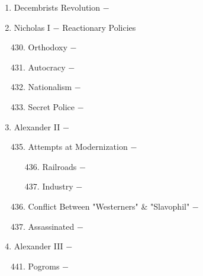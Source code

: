 \documentclass[12pt]{article}
\begin{document}
\begin{enumerate}
\item Decembrists Revolution $-$ 

\item Nicholas I $-$ Reactionary Policies

\begin{enumerate}[label=\arabic{*}.]
\setcounter{enumii}{429}

\item Orthodoxy $-$

\item Autocracy $-$ 

\item Nationalism $-$ 

\item Secret Police $-$ 

\end{enumerate}

\setcounter{enumi}{433}

\item Alexander II $-$ 

\begin{enumerate}[label=\arabic{*}.]
\setcounter{enumii}{434}

\item Attempts at Modernization $-$

\begin{enumerate}[label=\arabic{*}.]
\setcounter{enumiii}{435}

\item Railroads $-$ 

\item Industry $-$

\end{enumerate}
\setcounter{enumii}{437}

\item Conflict Between "Westerners" \& "Slavophil" $-$

\item Assassinated $-$

\end{enumerate}
\setcounter{enumi}{439}

\item Alexander III $-$ 


\begin{enumerate}[label=\arabic{*}.]
\setcounter{enumii}{440}

\item Pogroms $-$ 

\end{enumerate}
\setcounter{enumi}{441}


\end{enumerate}
\end{document}
